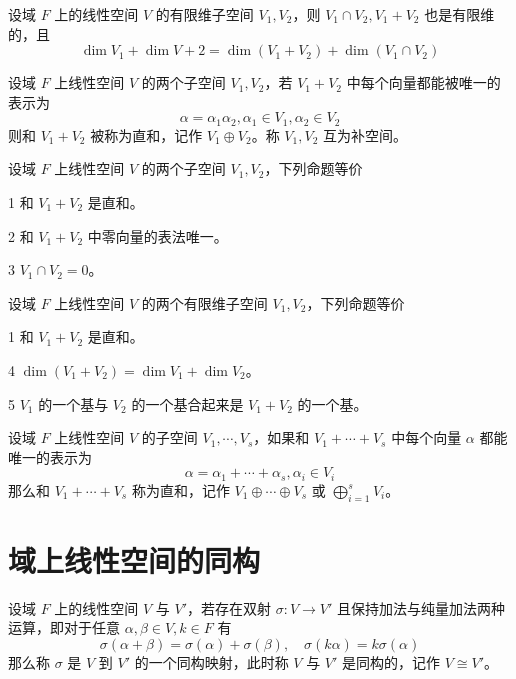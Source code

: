 \begin{theorem}
    设域 $F$ 上的线性空间 $V$ 的有限维子空间 $V_1,V_2$，则 $V_1 \cap V_2, V_1+V_2$ 也是有限维的，且
    \[ \dim V_1 + \dim V+2 = \dim(V_1+V_2) + \dim(V_1 \cap V_2) \]
\end{theorem}

\begin{definition}[直和]
    设域 $F$ 上线性空间 $V$ 的两个子空间 $V_1,V_2$，若 $V_1+V_2$ 中每个向量都能被唯一的表示为
    \[ \alpha = \alpha_1 \alpha_2, \alpha_1 \in V_1, \alpha_2 \in V_2 \]
    则和 $V_1+V_2$ 被称为直和，记作 $V_1 \oplus V_2$。称 $V_1,V_2$ 互为补空间。 
\end{definition}

\begin{theorem}
    设域 $F$ 上线性空间 $V$ 的两个子空间 $V_1,V_2$，下列命题等价

    \num{1} 和 $V_1+V_2$ 是直和。

    \num{2} 和 $V_1+V_2$ 中零向量的表法唯一。

    \num{3} $V_1 \cap V_2 = 0$。
\end{theorem}

\begin{theorem}
    设域 $F$ 上线性空间 $V$ 的两个有限维子空间 $V_1,V_2$，下列命题等价

    \num{1} 和 $V_1+V_2$ 是直和。

    \num{4} $\dim(V_1+V_2) = \dim V_1 + \dim V_2$。

    \num{5} $V_1$ 的一个基与 $V_2$ 的一个基合起来是 $V_1+V_2$ 的一个基。
\end{theorem}

\begin{definition}
    设域 $F$ 上线性空间 $V$ 的子空间 $V_1,\cdots,V_s$，如果和 $V_1+\cdots+V_s$ 中每个向量 $\alpha$ 都能唯一的表示为
    \[ \alpha = \alpha_1 + \cdots + \alpha_s, \alpha_i \in V_i \]
    那么和 $V_1 + \cdots + V_s$ 称为直和，记作 $V_1 \oplus \cdots \oplus V_s$ 或 $\displaystyle\bigoplus_{i=1}^s V_i$。
\end{definition}

\section{域上线性空间的同构}

\begin{definition}[同构]
    设域 $F$ 上的线性空间 $V$ 与 $V'$，若存在双射 $\sigma : V \to V'$ 且保持加法与纯量加法两种运算，即对于任意 $\alpha,\beta \in V,k\in F$ 有
    \[ \sigma(\alpha+\beta) = \sigma(\alpha) + \sigma(\beta), \quad \sigma(k\alpha) = k\sigma(\alpha) \]
    那么称 $\sigma$ 是 $V$ 到 $V'$ 的一个同构映射，此时称 $V$ 与 $V'$ 是同构的，记作 $V \cong V'$。
\end{definition}


